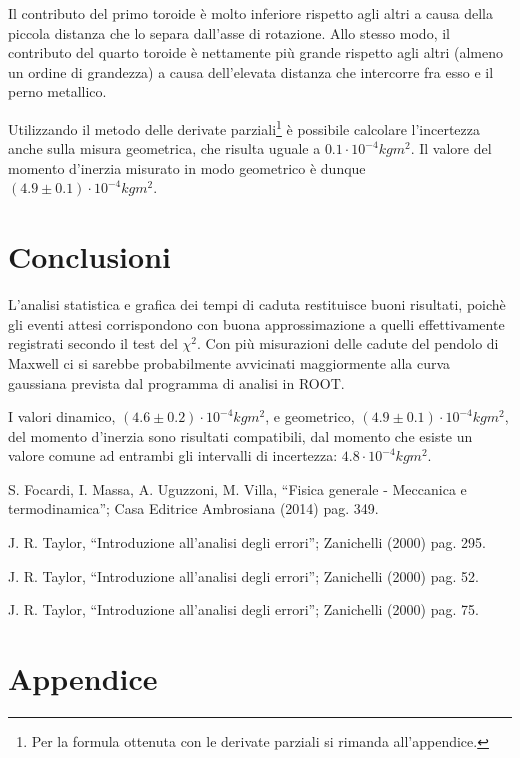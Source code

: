 \documentclass{article}
\newcommand{\quotes}[1]{``#1''}
\begin{document}
Il contributo del primo toroide è molto inferiore rispetto agli altri a causa della piccola distanza che lo separa dall'asse di rotazione. Allo stesso modo, il contributo del quarto toroide è nettamente più grande rispetto agli altri (almeno un ordine di grandezza) a causa dell'elevata distanza che intercorre fra esso e il perno metallico.

Utilizzando il metodo delle derivate parziali\footnote{Per la formula ottenuta con le derivate parziali si rimanda all'appendice.}\cite{taylor:derivate} è possibile calcolare l'incertezza anche sulla misura geometrica, che risulta uguale a $0.1 \cdot 10^{-4}kgm^2$. Il valore del momento d'inerzia misurato in modo geometrico è dunque $(4.9 \pm 0.1) \cdot 10^{-4}kgm^2$.

\section{Conclusioni}
L'analisi statistica e grafica dei tempi di caduta restituisce buoni risultati, poichè gli eventi attesi corrispondono con buona approssimazione a quelli effettivamente registrati secondo il test del $\chi ^2$. Con più misurazioni delle cadute del pendolo di Maxwell ci si sarebbe probabilmente avvicinati maggiormente alla curva gaussiana prevista dal programma di analisi in ROOT.

I valori dinamico, $(4.6 \pm 0.2) \cdot 10^{-4}kgm^2$, e geometrico, $(4.9 \pm 0.1) \cdot 10^{-4}kgm^2$, del momento d'inerzia sono risultati compatibili, dal momento che esiste un valore comune ad entrambi gli intervalli di incertezza: $4.8 \cdot 10^{-4}kgm^2$.

\newpage

\begin{thebibliography}{9}
S. Focardi, I. Massa, A. Uguzzoni, M. Villa, \quotes{Fisica generale - Meccanica e termodinamica}; Casa Editrice Ambrosiana (2014) pag. 349.

J. R. Taylor, \quotes{Introduzione all'analisi degli errori}; Zanichelli (2000) pag. 295.

J. R. Taylor, \quotes{Introduzione all'analisi degli errori}; Zanichelli (2000) pag. 52.

J. R. Taylor, \quotes{Introduzione all'analisi degli errori}; Zanichelli (2000) pag. 75.
\end{thebibliography}

\section*{Appendice}
\end{document}
